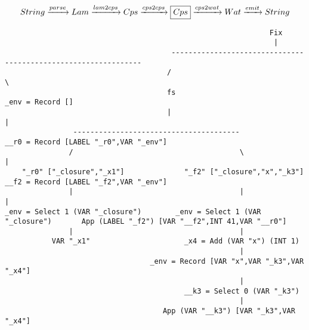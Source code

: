 \begin{landscape}
\begin{gather*}
  String \xrightarrow{parse} Lam \xrightarrow{lam2cps} Cps \xrightarrow{cps2cps} \boxed{Cps} \xrightarrow{cps2wat} Wat \xrightarrow{emit} String
\end{gather*}

\begin{lstlisting}
                                                              Fix
                                                               |
                                       ---------------------------------------------------------------
                                      /                                                               \
                                      fs                                                       _env = Record []
                                      |                                                               |
                ---------------------------------------                             __r0 = Record [LABEL "_r0",VAR "_env"]
               /                                       \                                              |
    "_r0" ["_closure","_x1"]              "_f2" ["_closure","x","_k3"]              __f2 = Record [LABEL "_f2",VAR "_env"]
               |                                       |                                              |
_env = Select 1 (VAR "_closure")        _env = Select 1 (VAR "_closure")       App (LABEL "_f2") [VAR "__f2",INT 41,VAR "__r0"]
               |                                       |
           VAR "_x1"                      _x4 = Add (VAR "x") (INT 1)
                                                       |
                                  _env = Record [VAR "x",VAR "_k3",VAR "_x4"]
                                                       |
                                          __k3 = Select 0 (VAR "_k3")
                                                       |
                                     App (VAR "__k3") [VAR "_k3",VAR "_x4"]

\end{lstlisting}
\end{landscape}
\clearpage

